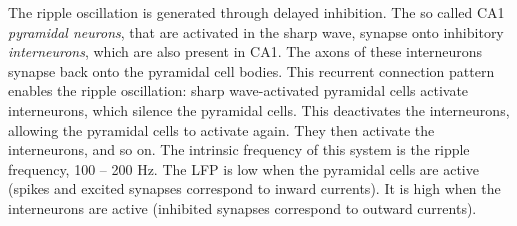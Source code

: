 The ripple oscillation is generated through delayed inhibition. The so called CA1 \emph{pyramidal neurons}, that are activated in the sharp wave, synapse onto inhibitory \emph{interneurons}, which are also present in CA1. The axons of these interneurons synapse back onto the pyramidal cell bodies. This recurrent connection pattern enables the ripple oscillation: sharp wave-activated pyramidal cells activate interneurons, which silence the pyramidal cells. This deactivates the interneurons, allowing the pyramidal cells to activate again. They then activate the interneurons, and so on. The intrinsic frequency of this system is the ripple frequency, 100 -- 200 Hz. The LFP is low when the pyramidal cells are active (spikes and excited synapses correspond to inward currents). It is high when the interneurons are active (inhibited synapses correspond to outward currents).
